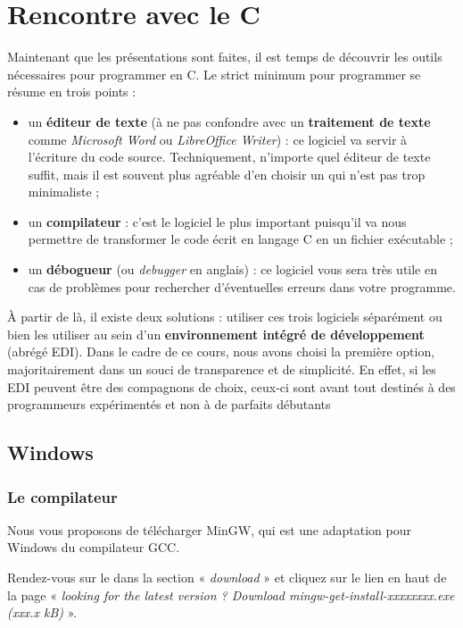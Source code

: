 \chapter{Rencontre avec le C}

Maintenant que les présentations sont faites, il est temps de
découvrir les outils nécessaires pour programmer en C. Le strict
minimum pour programmer se résume en trois points :

\begin{itemize}

\item un \textbf{éditeur de texte} (à ne pas confondre avec un
  \textbf{traitement de texte} comme \emph{Microsoft Word} ou
  \emph{LibreOffice Writer}) : ce logiciel va servir à l'écriture du
  code source. Techniquement, n'importe quel éditeur de texte suffit,
  mais il est souvent plus agréable d'en choisir un qui n'est pas trop
  minimaliste ;
\item
  un \textbf{compilateur} : c'est le logiciel le plus important
  puisqu'il va nous permettre de transformer le code écrit en langage C
  en un fichier exécutable ;
\item un \textbf{débogueur} (ou \emph{debugger} en anglais) : ce
  logiciel vous sera très utile en cas de problèmes pour rechercher
  d'éventuelles erreurs dans votre programme.
\end{itemize}

À partir de là, il existe deux solutions : utiliser ces trois
logiciels séparément ou bien les utiliser au sein d'un
\textbf{environnement intégré de développement} (abrégé EDI). Dans le
cadre de ce cours, nous avons choisi la première option,
majoritairement dans un souci de transparence et de simplicité. En
effet, si les EDI peuvent être des compagnons de choix, ceux-ci sont
avant tout destinés à des programmeurs expérimentés et non à de
parfaits débutants

\section{Windows} 

\subsection{Le compilateur}

Nous vous proposons de télécharger MinGW, qui est une adaptation pour
Windows du compilateur GCC.

Rendez-vous sur le  dans
la section « \emph{download} » et cliquez sur le lien en haut de la
page « \emph{looking for the latest version ? Download
  mingw-get-install-xxxxxxxx.exe (xxx.x kB)} ».

